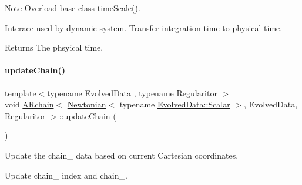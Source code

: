 \begin{DoxyNote}{Note}
Overload base class \mbox{\hyperlink{class_a_rchain_3_01_newtonian_3_01typename_01_evolved_data_1_1_scalar_01_4_00_01_evolved_data_00_01_regularitor_01_4_aa7aadb0b5ffcfebc759e4f091c4fc763}{time\+Scale()}}.
\end{DoxyNote}
Interace used by dynamic system. Transfer integration time to physical time. \begin{DoxyReturn}{Returns}
The phsyical time. 
\end{DoxyReturn}
\mbox{\label{class_a_rchain_3_01_newtonian_3_01typename_01_evolved_data_1_1_scalar_01_4_00_01_evolved_data_00_01_regularitor_01_4_acbe31e9aa918e4f80a2763e16f0bb7bc}} 
\paragraph{\texorpdfstring{update\+Chain()}{updateChain()}}
{\footnotesize\ttfamily template$<$typename Evolved\+Data , typename Regularitor $>$ \\
void \mbox{\hyperlink{class_a_rchain}{A\+Rchain}}$<$ \mbox{\hyperlink{class_newtonian}{Newtonian}}$<$ typename \mbox{\hyperlink{class_a_rchain_a707e42a79e4744424a34c9007e84ee07}{Evolved\+Data\+::\+Scalar}} $>$, Evolved\+Data, Regularitor $>$\+::update\+Chain (\begin{DoxyParamCaption}{ }\end{DoxyParamCaption})\hspace{0.3cm}{\ttfamily [private]}}



Update the chain_ data based on current Cartesian coordinates.

Update chain_ index and chain_.

